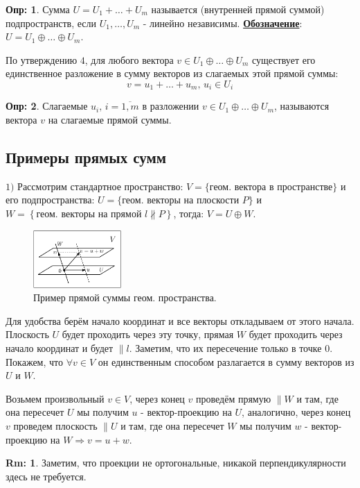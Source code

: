 \documentclass[12pt]{article}
\theoremstyle{definition}
\newtheorem{defn}{Опр:}
\newtheorem{rem}{Rm:}
\begin{document}
\begin{defn}
	Сумма $U = U_1 + \dotsc + U_m$ называется  (внутренней прямой суммой) подпространств, если $U_1,\dotsc, U_m$ - линейно независимы. \uline{\textbf{Обозначение}}: $U = U_1 \oplus \dotsc \oplus U_m$.
\end{defn}
По утверждению $4$, для любого вектора $v \in U_1 \oplus \dotsc \oplus U_m$ существует его единственное разложение в сумму векторов из слагаемых этой прямой суммы:
$$
	v = u_1 + \dotsc + u_m, \, u_i \in U_i
$$

\begin{defn}
	Слагаемые $u_i, \, i = \overline{1,m}$ в разложении $v \in U_1 \oplus \dotsc \oplus U_m$, называются  вектора $v$ на слагаемые прямой суммы.
\end{defn}

\subsection*{Примеры прямых сумм}

$1)$ Рассмотрим стандартное пространство: $V = \{\text{геом. вектора в пространстве}\}$ и его подпространства: $U = \{\text{геом. векторы на плоскости }P\}$ и $W = \left\{\text{геом. векторы на прямой }l\nparallel P\right\}$, тогда: $V = U \oplus W$.
\begin{figure}[H]
	\centering
	\includegraphics[width=0.3\textwidth]{LAL3_3.eps}
	\caption{Пример прямой суммы геом. пространства.}
	\label{3_3}
\end{figure}
Для удобства берём начало координат и все векторы откладываем от этого начала. Плоскость $U$ будет проходить через эту точку, прямая $W$ будет проходить через начало координат и будет $\parallel l$. Заметим, что их пересечение только в точке $0$. Покажем, что $\forall v \in V$ он единственным способом разлагается в сумму векторов из $U$ и $W$.

Возьмем произвольный $v \in V$, через конец $v$ проведём прямую $\parallel W$ и там, где она пересечет $U$ мы получим $u$ - вектор-проекцию на $U$, аналогично, через конец $v$ проведем плоскость $\parallel U$ и там, где она пересечет $W$ мы получим $w$ - вектор-проекцию на $W \Rightarrow v = u + w$.
\begin{rem}
	Заметим, что проекции не ортогональные, никакой перпендикулярности здесь не требуется.
\end{rem}
\end{document}
